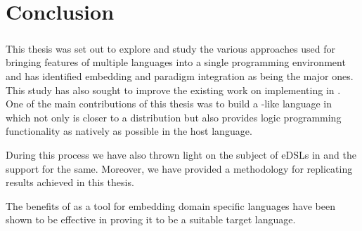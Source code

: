 \documentclass[thesis-solanki.tex]{subfiles}
\begin{document}
\chapter{Conclusion}\label{chap:conclusion}
\paragraph{}
This thesis was set out to explore and study the various approaches used for bringing features of multiple languages into a single 
programming environment and has identified embedding and paradigm integration as being the major ones. This study has also sought to improve
the existing work on implementing  in . One of the main contributions of this thesis was to build a 
-like language in  which not only is closer to a  distribution but also provides 
logic programming functionality as natively as possible in the host language.

During this process we have also thrown light on the subject of eDSLs in  and the support for the same. Moreover, we
have provided a methodology for replicating results achieved in this thesis.

The benefits of  as a tool for embedding domain specific languages have been shown to be effective in proving it to be
a suitable target language.


\ifMain
\begin{scope}
  \nolinenumbers
  \enotesize
  \par
  \begin{singlespace}
  \setlength{\parskip}{12pt plus 2pt minus 1pt}
  \theendnotes
  \par
  \end{singlespace}
\end{scope}
\fi
\end{document}
